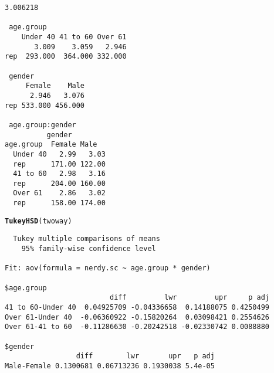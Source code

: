 \documentclass[12pt,a4paper]{article}\usepackage[]{graphicx}\usepackage[]{color}
\makeatletter
\newcommand{\hlstd}[1]{\textcolor[rgb]{0.345,0.345,0.345}{#1}}%
\newcommand{\hlkwd}[1]{\textcolor[rgb]{0.737,0.353,0.396}{\textbf{#1}}}%
\newenvironment{kframe}{%
 \def\at@end@of@kframe{}%
 \ifinner\ifhmode%
  \def\at@end@of@kframe{\end{minipage}}%
  \begin{minipage}{\columnwidth}%
 \fi\fi%
 \def\FrameCommand##1{\hskip\@totalleftmargin \hskip-\fboxsep
 \colorbox{shadecolor}{##1}\hskip-\fboxsep
     \hskip-\linewidth \hskip-\@totalleftmargin \hskip\columnwidth}%
 \MakeFramed {\advance\hsize-\width
   \@totalleftmargin\z@ \linewidth\hsize
   \@setminipage}}%
 {\par\unskip\endMakeFramed%
 \at@end@of@kframe}
\newenvironment{knitrout}{}{} %
\makeatother
\begin{document}
\begin{enumerate}[(i)]
\begin{knitrout}
\begin{kframe}
\begin{verbatim}
3.006218 

 age.group 
    Under 40 41 to 60 Over 61
       3.009    3.059   2.946
rep  293.000  364.000 332.000

 gender 
     Female    Male
      2.946   3.076
rep 533.000 456.000

 age.group:gender 
          gender
age.group  Female Male  
  Under 40   2.99   3.03
  rep      171.00 122.00
  41 to 60   2.98   3.16
  rep      204.00 160.00
  Over 61    2.86   3.02
  rep      158.00 174.00
\end{verbatim}
\begin{alltt}
\hlkwd{TukeyHSD}\hlstd{(twoway)}
\end{alltt}
\begin{verbatim}
  Tukey multiple comparisons of means
    95% family-wise confidence level

Fit: aov(formula = nerdy.sc ~ age.group * gender)

$age.group
                         diff         lwr         upr     p adj
41 to 60-Under 40  0.04925709 -0.04336658  0.14188075 0.4250499
Over 61-Under 40  -0.06360922 -0.15820264  0.03098421 0.2554626
Over 61-41 to 60  -0.11286630 -0.20242518 -0.02330742 0.0088880

$gender
                 diff        lwr       upr   p adj
Male-Female 0.1300681 0.06713236 0.1930038 5.4e-05


\end{verbatim}
\end{kframe}
\end{knitrout}
\end{enumerate}
\end{document}
